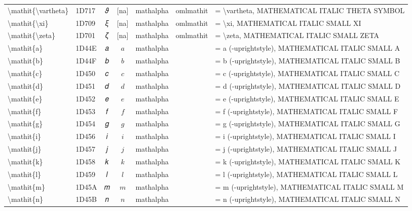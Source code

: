 \documentclass[a4paper,landscape]{article}
\begin{document}
\begin{longtable}{llcclll}
\textbackslash{}mathit\{\textbackslash{}vartheta\} & 1D717 & 𝜗 & [na] & mathalpha & omlmathit & = \textbackslash{}vartheta,  MATHEMATICAL ITALIC THETA SYMBOL \\
\textbackslash{}mathit\{\textbackslash{}xi\} & 1D709 & 𝜉 & [na] & mathalpha & omlmathit & = \textbackslash{}xi,  MATHEMATICAL ITALIC SMALL XI \\
\textbackslash{}mathit\{\textbackslash{}zeta\} & 1D701 & 𝜁 & [na] & mathalpha & omlmathit & = \textbackslash{}zeta,  MATHEMATICAL ITALIC SMALL ZETA \\
\textbackslash{}mathit\{a\} & 1D44E & 𝑎 & $\mathit{a}$ & mathalpha &  & = a (-uprightstyle),  MATHEMATICAL ITALIC SMALL A \\
\textbackslash{}mathit\{b\} & 1D44F & 𝑏 & $\mathit{b}$ & mathalpha &  & = b (-uprightstyle),  MATHEMATICAL ITALIC SMALL B \\
\textbackslash{}mathit\{c\} & 1D450 & 𝑐 & $\mathit{c}$ & mathalpha &  & = c (-uprightstyle),  MATHEMATICAL ITALIC SMALL C \\
\textbackslash{}mathit\{d\} & 1D451 & 𝑑 & $\mathit{d}$ & mathalpha &  & = d (-uprightstyle),  MATHEMATICAL ITALIC SMALL D \\
\textbackslash{}mathit\{e\} & 1D452 & 𝑒 & $\mathit{e}$ & mathalpha &  & = e (-uprightstyle),  MATHEMATICAL ITALIC SMALL E \\
\textbackslash{}mathit\{f\} & 1D453 & 𝑓 & $\mathit{f}$ & mathalpha &  & = f (-uprightstyle),  MATHEMATICAL ITALIC SMALL F \\
\textbackslash{}mathit\{g\} & 1D454 & 𝑔 & $\mathit{g}$ & mathalpha &  & = g (-uprightstyle),  MATHEMATICAL ITALIC SMALL G \\
\textbackslash{}mathit\{i\} & 1D456 & 𝑖 & $\mathit{i}$ & mathalpha &  & = i (-uprightstyle),  MATHEMATICAL ITALIC SMALL I \\
\textbackslash{}mathit\{j\} & 1D457 & 𝑗 & $\mathit{j}$ & mathalpha &  & = j (-uprightstyle),  MATHEMATICAL ITALIC SMALL J \\
\textbackslash{}mathit\{k\} & 1D458 & 𝑘 & $\mathit{k}$ & mathalpha &  & = k (-uprightstyle),  MATHEMATICAL ITALIC SMALL K \\
\textbackslash{}mathit\{l\} & 1D459 & 𝑙 & $\mathit{l}$ & mathalpha &  & = l (-uprightstyle),  MATHEMATICAL ITALIC SMALL L \\
\textbackslash{}mathit\{m\} & 1D45A & 𝑚 & $\mathit{m}$ & mathalpha &  & = m (-uprightstyle),  MATHEMATICAL ITALIC SMALL M \\
\textbackslash{}mathit\{n\} & 1D45B & 𝑛 & $\mathit{n}$ & mathalpha &  & = n (-uprightstyle),  MATHEMATICAL ITALIC SMALL N \\

\end{longtable}
\end{document}
